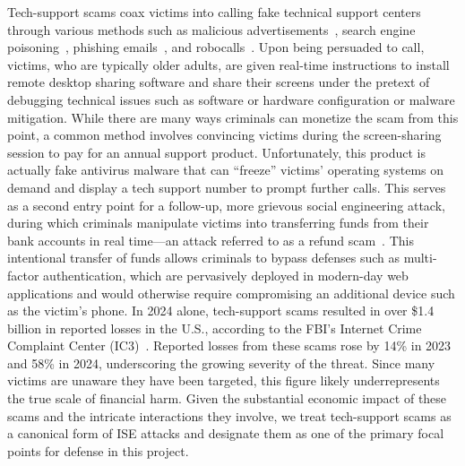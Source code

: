  Tech-support scams coax victims into calling fake technical support centers through various methods such as malicious advertisements~\cite{seacma,MiramirkhaniSN16}, search engine poisoning~\cite{SrinivasanKMANA18}, phishing emails~\cite{tasr}, and robocalls~\cite{PrasadDRR23}. Upon being persuaded to call, victims, who are typically older adults, are given real-time instructions to install remote desktop sharing software and share their screens under the pretext of debugging technical issues such as software or hardware configuration or malware mitigation. While there are many ways criminals can monetize the scam from this point, a common method involves convincing victims during the screen-sharing session to pay for an annual support product. Unfortunately, this product is actually fake antivirus malware that can ``freeze'' victims' operating systems on demand and display a tech support number to prompt further calls. This serves as a second entry point for a follow-up, more grievous social engineering attack, during which criminals manipulate victims into transferring funds from their bank accounts in real time—an attack referred to as a refund scam~\cite{tasr}.
This intentional transfer of funds allows criminals to bypass defenses such as multi-factor authentication, which are pervasively deployed in modern-day web applications and would otherwise require compromising an additional device such as the victim's phone. In 2024 alone, tech-support scams resulted in over \$1.4 billion in reported losses in the U.S., according to the FBI's Internet Crime Complaint Center (IC3)~\cite{ic3_report_24}. Reported losses from these scams rose by 14\% in 2023 and 58\% in 2024, underscoring the growing severity of the threat. Since many victims are unaware they have been targeted, this figure likely underrepresents the true scale of financial harm. Given the substantial economic impact of these scams and the intricate interactions they involve, we treat tech-support scams as a canonical form of ISE attacks and designate them as one of the primary focal points for defense in this project.
